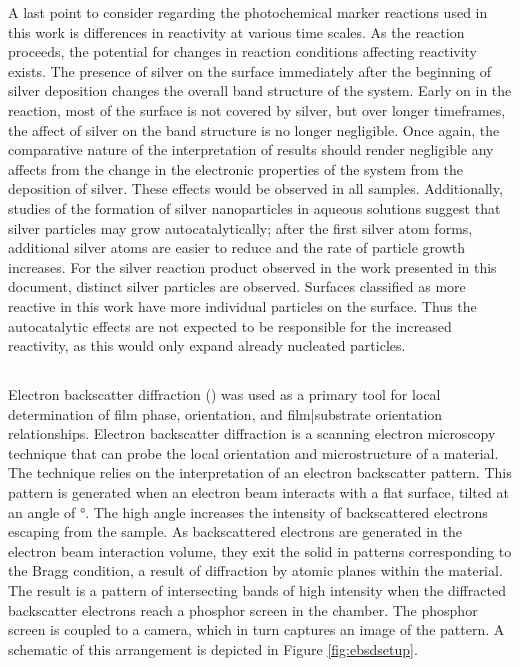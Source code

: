 \label{timescales}A last point to consider regarding the photochemical marker reactions
used in this work is differences in reactivity at various time scales. As the reaction
proceeds, the potential for changes in reaction conditions affecting reactivity exists.
The presence of silver on the surface immediately after the beginning of silver deposition
changes the overall band structure of the system. Early on in the reaction, most of the
surface is not covered by silver, but over longer timeframes, the affect of silver on the
band structure is no longer negligible. Once again, the comparative nature of the
interpretation of results should render negligible any affects from the change in the
electronic properties of the system from the deposition of silver. These effects would be
observed in all samples. Additionally, studies of the formation of silver nanoparticles in
aqueous solutions suggest that silver particles may grow
autocatalytically;\cite{Ershov:1993ci,VanHyning:2001vl} after the first silver atom forms,
additional silver atoms are easier to reduce and the rate of particle growth increases.
For the silver reaction product observed in the work presented in this document, distinct
silver particles are observed. Surfaces classified as more reactive in this work have more
individual particles on the surface. Thus the autocatalytic effects are not expected to be
responsible for the increased reactivity, as this would only expand already nucleated
particles.

\subsection{}
\label{subsec:exp.ebsd}


Electron backscatter diffraction () was used as a primary tool for local
determination of film phase, orientation, and film|substrate orientation relationships.
Electron backscatter diffraction is a scanning electron microscopy technique that can
probe the local orientation and microstructure of a
material.\cite{Dingley:1997tw,Schwartz:2009ue} The technique relies on the interpretation
of an electron backscatter pattern. This pattern is generated when an electron beam
interacts with a flat surface, tilted at an angle of \si{\degree}. The high
angle increases the intensity of backscattered electrons escaping from the sample.   As
backscattered electrons are generated in the electron beam interaction volume, they exit
the solid in patterns corresponding to the Bragg condition, a result of diffraction by
atomic planes within the material. The result is a  pattern of intersecting bands of high
intensity when the diffracted backscatter electrons reach a phosphor screen in the
 chamber. The phosphor screen is coupled to a  camera, which in turn
captures an image of the pattern. A schematic of this arrangement is depicted in Figure
\ref{fig:ebsdsetup}. 

